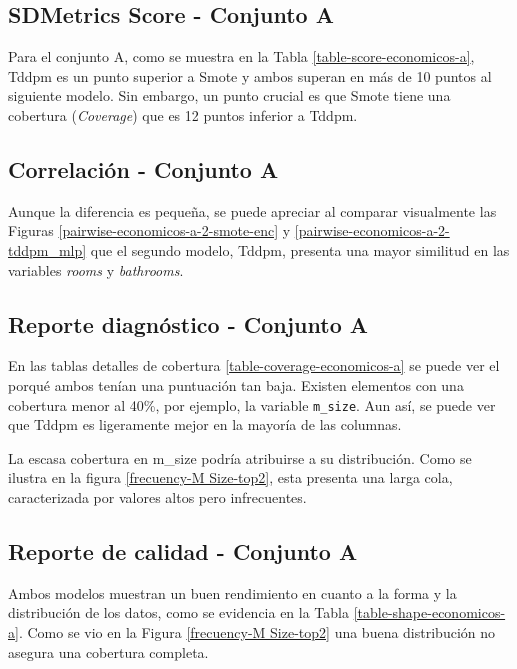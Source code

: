\newpage
\subsection{SDMetrics Score - Conjunto A}
\label{ds-conjunto-a}
Para el conjunto A, como se muestra en la Tabla \ref{table-score-economicos-a}, Tddpm es un punto superior a Smote y ambos superan en más de 10 puntos al siguiente modelo. Sin embargo, un punto crucial es que Smote tiene una cobertura (\emph{Coverage}) que es 12 puntos inferior a Tddpm.



\newpage
\subsection{Correlación - Conjunto A}
\label{correlacion-conjunto-a}
Aunque la diferencia es pequeña, se puede apreciar al comparar visualmente las Figuras \ref{pairwise-economicos-a-2-smote-enc} y \ref{pairwise-economicos-a-2-tddpm_mlp} que el segundo modelo, Tddpm, presenta una mayor similitud en las variables \emph{rooms} y \emph{bathrooms}.




\newpage
\subsection{Reporte diagnóstico - Conjunto A}
\label{diagnostico-conjunto-a}
En las tablas detalles de cobertura \ref{table-coverage-economicos-a} se puede ver el porqué ambos tenían una puntuación tan baja. Existen elementos con una cobertura menor al 40\%, por ejemplo, la variable \texttt{m\_size}. Aun así, se puede ver que Tddpm es ligeramente mejor en la mayoría de las columnas.

La escasa cobertura en m\_size podría atribuirse a su distribución. Como se ilustra en la figura \ref{frecuency-M Size-top2}, esta presenta una larga cola, caracterizada por valores altos pero infrecuentes.

\newpage
\subsection{Reporte de calidad - Conjunto A}
\label{calidad-conjunto-a}
Ambos modelos muestran un buen rendimiento en cuanto a la forma y la distribución de los datos, como se evidencia en la Tabla \ref{table-shape-economicos-a}. Como se vio en la Figura  \ref{frecuency-M Size-top2} una buena distribución no asegura una cobertura completa.




